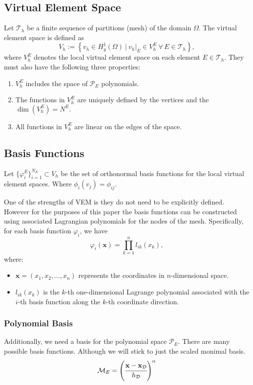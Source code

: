 \documentclass[class=article, crop=false]{standalone}
\begin{document}
\subsection{Virtual Element Space}
Let $\mathcal{T}_h$ be a finite sequence of partitions (mesh) of the domain $\Omega$. The virtual element space is defined as
$$
V_h := \left\{ v_h \in H^1_g(\Omega) \ \bigg| \ v_h|_E \in V_h^E \ \forall \, E \in \mathcal{T}_h \right\},
$$
where $V_h^E$ denotes the local virtual element space on each element $E \in \mathcal{T}_h$. They must also have the following three properties:
\begin{enumerate}
    \item $V^E_h$ includes the space of $\mathcal{P}_E$ polynomials.

    \item The functions in $V^E_h$ are uniquely defined by the vertices and the$\operatorname{dim}(V^E_h) = N^E.$

    \item All functions in $V^E_h$ are linear on the edges of the space.
\end{enumerate}
\cite{sutton2017virtual}


\subsection{Basis Functions}
Let $\{\varphi_i^E\}_{i=1}^{N_E} \subset V_h$ be the set of orthonormal basis functions for the local virtual element spaces. Where $\phi_i(v_j) = \phi_{ij}.$

One of the strengths of VEM is they do not need to be explicitly defined. However for the purposes of this paper the basis functions can be constructed using associated Lagrangian polynomials for the nodes of the mesh. Specifically, for each basis function $\varphi_i$, we have
$$
\varphi_i(\mathbf{x}) = \prod_{k=1}^{n} l_{ik}(x_k),
$$
where:
\begin{itemize}
    \item $\mathbf{x} = (x_1, x_2, \ldots, x_n)$ represents the coordinates in $n$-dimensional space.
    \item $l_{ik}(x_k)$ is the $k$-th one-dimensional Lagrange polynomial associated with the $i$-th basis function along the $k$-th coordinate direction.
\end{itemize}

\subsubsection{Polynomial Basis}
Additionally, we need a basis for the polynomial space $\mathcal{P}_E$. There are many possible basis functions. Although we will stick to just the scaled monimal basis.
\begin{equation}
    \mathcal{M}_E = \left(\cfrac{\mathbf{x} - \mathbf{x}_{\mathcal{D}}}{h_{\mathcal{D}}}\right)^{\alpha}
\end{equation}
\end{document}

